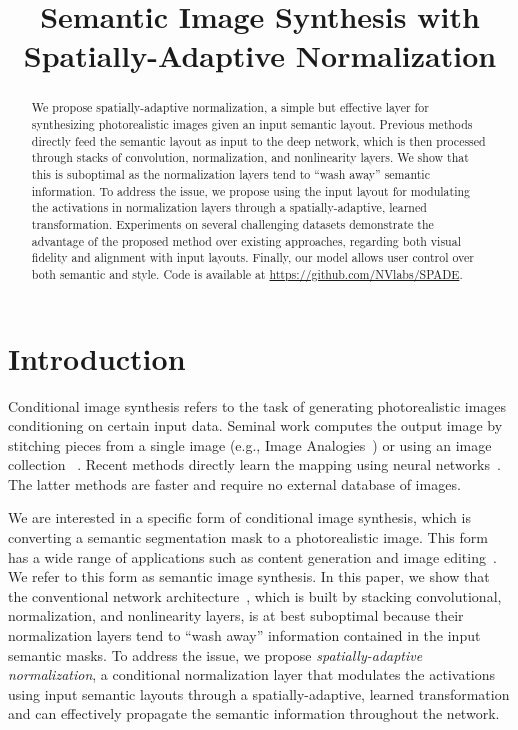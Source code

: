 \title{Semantic Image Synthesis with Spatially-Adaptive Normalization}

\begin{abstract}
 We propose spatially-adaptive normalization, a simple but effective layer for synthesizing photorealistic images given an input semantic layout. Previous methods directly feed the semantic layout as input to the deep network, which is then processed through stacks of convolution, normalization, and nonlinearity layers. We show that this is suboptimal as the normalization layers tend to ``wash away'' semantic information. To address the issue, we propose using the input layout for modulating the activations in normalization layers through a spatially-adaptive, learned transformation. Experiments on several challenging datasets demonstrate the advantage of the proposed method over existing approaches, regarding both visual fidelity and alignment with input layouts. Finally, our model allows user control over both semantic and style. Code is available at \url{https://github.com/NVlabs/SPADE}.
\end{abstract}

\section{Introduction}

Conditional image synthesis refers to the task of generating photorealistic images conditioning on certain input data. Seminal work computes the output image by stitching pieces from a single image (e.g., Image Analogies~\cite{hertzmann2001image}) or using an image collection ~\cite{johnson2006semantic,hays2007scene,lalonde2007photo,chen2009sketch2photo,Eitz:2009:PhotoSketch}. Recent methods directly learn the mapping using neural networks~\cite{isola2017image,chen2017photographic,wang2018pix2pixHD,wang2018video,zhang2017stackgan,zhang2017stackgan++,zhang2018self,brock2018large}. The latter methods are faster and require no external database of images.

We are interested in a specific form of conditional image synthesis, which is converting a semantic segmentation mask to a photorealistic image. This form has a wide range of applications such as content generation and image editing~\cite{isola2017image,chen2017photographic,wang2018pix2pixHD}. We refer to this form as semantic image synthesis. In this paper, we show that the conventional network architecture~\cite{isola2017image,wang2018pix2pixHD}, which is built by stacking convolutional, normalization, and nonlinearity layers, is at best suboptimal because their normalization layers tend to ``wash away'' information contained in the input semantic masks. To address the issue, we propose \textit{spatially-adaptive normalization}, a conditional normalization layer that modulates the activations using input semantic layouts through a spatially-adaptive, learned transformation and can effectively propagate the semantic information throughout the network.

